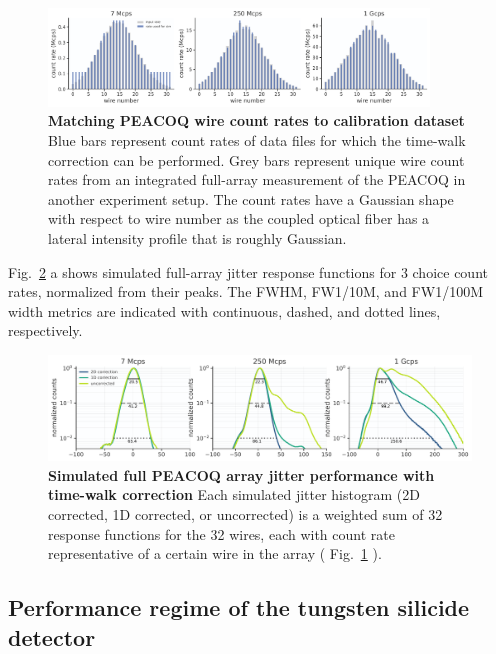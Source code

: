 \documentclass[11pt]{caltech_thesis} %
\begin{document}
\hypertarget{fig:matching}{%
\begin{figure}
\centering
\includegraphics[width=0.9\textwidth,height=\textheight]{./chapter_03/figs/peacoq_array_sim_light.pdf}
\caption[{Matching PEACOQ wire count rates to calibration dataset}]{\textbf{Matching PEACOQ wire count rates to calibration dataset} Blue bars represent count rates of data files for which the time-walk correction can be performed. Grey bars represent unique wire count rates from an integrated full-array measurement of the PEACOQ in another experiment setup. The count rates have a Gaussian shape with respect to wire number as the coupled optical fiber has a lateral intensity profile that is roughly Gaussian.}
\label{fig:matching}
\end{figure}
}

Fig.~\ref{fig:simulation_results} a shows simulated full-array jitter response functions for 3 choice count rates, normalized from their peaks. The FWHM, FW1/10M, and FW1/100M width metrics are indicated with continuous, dashed, and dotted lines, respectively.

\hypertarget{fig:simulation_results}{%
\begin{figure}
\centering
\includegraphics[width=1\textwidth,height=\textheight]{./chapter_03/figs/array_simulation_results_light.pdf}
\caption[{Simulated full PEACOQ array jitter performance with time-walk correction}]{\textbf{Simulated full PEACOQ array jitter performance with time-walk correction} Each simulated jitter histogram (2D corrected, 1D corrected, or uncorrected) is a weighted sum of 32 response functions for the 32 wires, each with count rate representative of a certain wire in the array ( Fig.~\ref{fig:matching} ).}
\label{fig:simulation_results}
\end{figure}
}

\hypertarget{performance-regime-of-the-tungsten-silicide-detector}{%
\subsection{Performance regime of the tungsten silicide detector}\label{performance-regime-of-the-tungsten-silicide-detector}}
\end{document}
